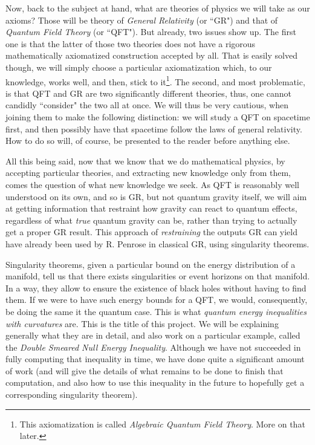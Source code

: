 \documentclass[a4paper,11pt]{article}
\numberwithin{equation}{section}
\theoremstyle{definition}
\begin{document}
Now, back to the subject at hand, what are theories of physics we will take as our axioms? Those will be theory of \textit{General Relativity} (or ``GR") and that of \textit{Quantum Field Theory} (or ``QFT"). But already, two issues show up. The first one is that the latter of those two theories does not have a rigorous mathematically axiomatized construction accepted by all. That is easily solved though, we will simply choose a particular axiomatization which, to our knowledge, works well, and then, stick to it\footnote{This axiomatization is called \textit{Algebraic Quantum Field Theory}. More on that later.}. The second, and most problematic, is that QFT and GR are two significantly different theories, thus, one cannot candidly ``consider" the two all at once. We will thus be very cautious, when joining them to make the following distinction: we will study a QFT on spacetime first, and then possibly have that spacetime follow the laws of general relativity. How to do so will, of course, be presented to the reader before anything else.

All this being said, now that we know that we do mathematical physics, by accepting particular theories, and extracting new knowledge only from them, comes the question of what new knowledge we seek. As QFT is reasonably well understood on its own, and so is GR, but not quantum gravity itself, we will aim at getting information that restraint how gravity can react to quantum effects, regardless of what \textit{true} quantum gravity can be, rather than trying to actually get a proper GR result. This approach of \textit{restraining} the outputs GR can yield have already been used by R. Penrose in classical GR, using singularity theorems. 

Singularity theorems, given a particular bound on the energy distribution of a manifold, tell us that there exists singularities or event horizons on that manifold. In a way, they allow to ensure the existence of black holes without having to find them. If we were to have such energy bounds for a QFT, we would, consequently, be doing the same it the quantum case. This is what \textit{quantum energy inequalities with curvatures} are. This is the title of this project. We will be explaining generally what they are in detail, and also work on a particular example, called the \textit{Double Smeared Null Energy Inequality}. Although we have not succeeded in fully computing that inequality in time, we have done quite a significant amount of work (and will give the details of what remains to be done to finish that computation, and also how to use this inequality in the future to hopefully get a corresponding singularity theorem).
\end{document}
